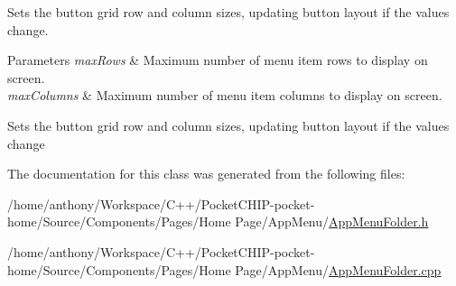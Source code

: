Sets the button grid row and column sizes, updating button layout if the values change.


\begin{DoxyParams}{Parameters}
{\em max\+Rows} & Maximum number of menu item rows to display on screen.\\
\hline
{\em max\+Columns} & Maximum number of menu item columns to display on screen.\\
\hline
\end{DoxyParams}
Sets the button grid row and column sizes, updating button layout if the values change 

The documentation for this class was generated from the following files\+:\begin{DoxyCompactItemize}
\item 
/home/anthony/\+Workspace/\+C++/\+Pocket\+C\+H\+I\+P-\/pocket-\/home/\+Source/\+Components/\+Pages/\+Home Page/\+App\+Menu/\mbox{\hyperlink{AppMenuFolder_8h}{App\+Menu\+Folder.\+h}}\item 
/home/anthony/\+Workspace/\+C++/\+Pocket\+C\+H\+I\+P-\/pocket-\/home/\+Source/\+Components/\+Pages/\+Home Page/\+App\+Menu/\mbox{\hyperlink{AppMenuFolder_8cpp}{App\+Menu\+Folder.\+cpp}}\end{DoxyCompactItemize}
